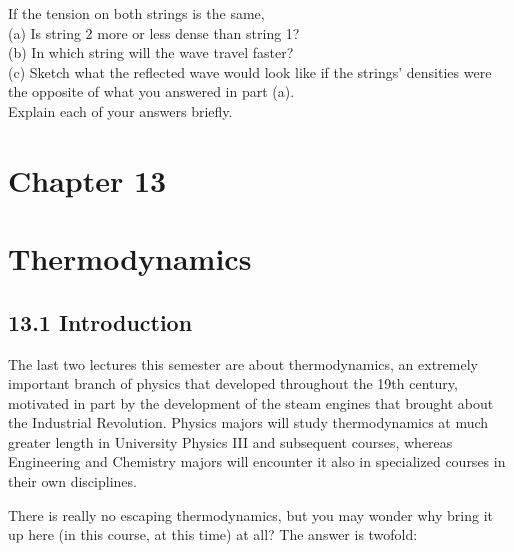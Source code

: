 \documentclass[10pt]{article}
\begin{document}
If the tension on both strings is the same,\\
(a) Is string 2 more or less dense than string 1?\\
(b) In which string will the wave travel faster?\\
(c) Sketch what the reflected wave would look like if the strings' densities were the opposite of what you answered in part (a).\\
Explain each of your answers briefly.

\section*{Chapter 13}
\section*{Thermodynamics}
\subsection*{13.1 Introduction}
The last two lectures this semester are about thermodynamics, an extremely important branch of physics that developed throughout the 19th century, motivated in part by the development of the steam engines that brought about the Industrial Revolution. Physics majors will study thermodynamics at much greater length in University Physics III and subsequent courses, whereas Engineering and Chemistry majors will encounter it also in specialized courses in their own disciplines.

There is really no escaping thermodynamics, but you may wonder why bring it up here (in this course, at this time) at all? The answer is twofold:
\end{document}
